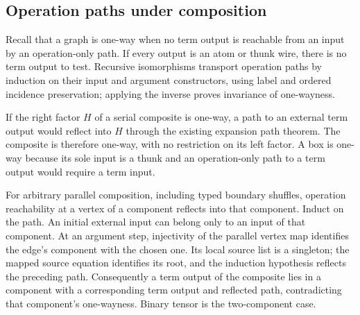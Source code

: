 
\subsection{Operation paths under composition}
Recall that a graph is one-way when no term output is reachable from an
input by an operation-only path. If every output is an atom or thunk wire,
there is no term output to test. Recursive isomorphisms transport operation
paths by induction on their input and argument constructors, using label and
ordered incidence preservation; applying the inverse proves invariance of
one-wayness.


If the right factor $H$ of a serial composite is one-way, a path to an
external term output would reflect into $H$ through the existing expansion
path theorem. The composite is therefore one-way, with no restriction on
its left factor. A box is one-way because its sole input is a thunk and an
operation-only path to a term output would require a term input.


For arbitrary parallel composition, including typed boundary shuffles,
operation reachability at a vertex of a component reflects into that
component. Induct on the path. An initial external input can belong only to
an input of that component. At an argument step, injectivity of the parallel
vertex map identifies the edge's component with the chosen one. Its local
source list is a singleton; the mapped source equation identifies its root,
and the induction hypothesis reflects the preceding path. Consequently a
term output of the composite lies in a component with a corresponding term
output and reflected path, contradicting that component's one-wayness.
Binary tensor is the two-component case.


